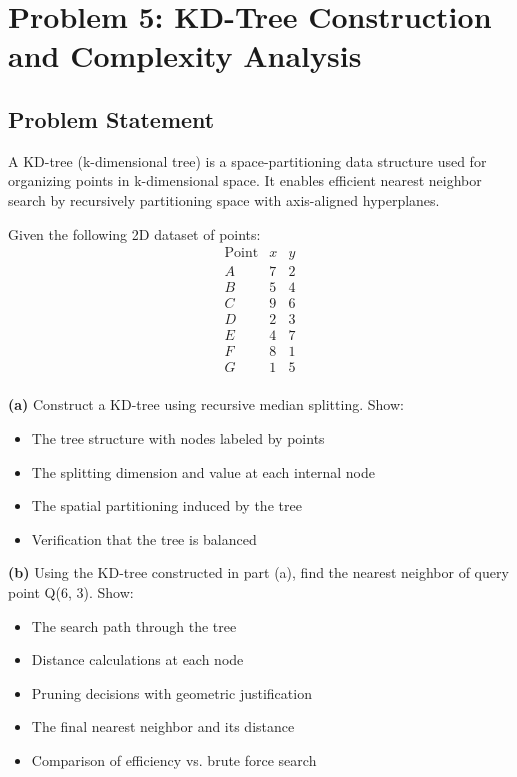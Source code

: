\documentclass[12pt]{article}
\begin{document}
\newpage
\section{Problem 5: KD-Tree Construction and Complexity Analysis}

\subsection{Problem Statement}

A KD-tree (k-dimensional tree) is a space-partitioning data structure used for organizing points in k-dimensional space. It enables efficient nearest neighbor search by recursively partitioning space with axis-aligned hyperplanes.

Given the following 2D dataset of points:
\[
\begin{array}{c|cc}
\text{Point} & x & y \\
\hline
A & 7 & 2 \\
B & 5 & 4 \\
C & 9 & 6 \\
D & 2 & 3 \\
E & 4 & 7 \\
F & 8 & 1 \\
G & 1 & 5 \\
\end{array}
\]

\textbf{(a)} Construct a KD-tree using recursive median splitting. Show:
\begin{itemize}
    \item The tree structure with nodes labeled by points
    \item The splitting dimension and value at each internal node
    \item The spatial partitioning induced by the tree
    \item Verification that the tree is balanced
\end{itemize}

\textbf{(b)} Using the KD-tree constructed in part (a), find the nearest neighbor of query point Q(6, 3). Show:
\begin{itemize}
    \item The search path through the tree
    \item Distance calculations at each node
    \item Pruning decisions with geometric justification
    \item The final nearest neighbor and its distance
    \item Comparison of efficiency vs. brute force search
\end{itemize}
\end{document}
